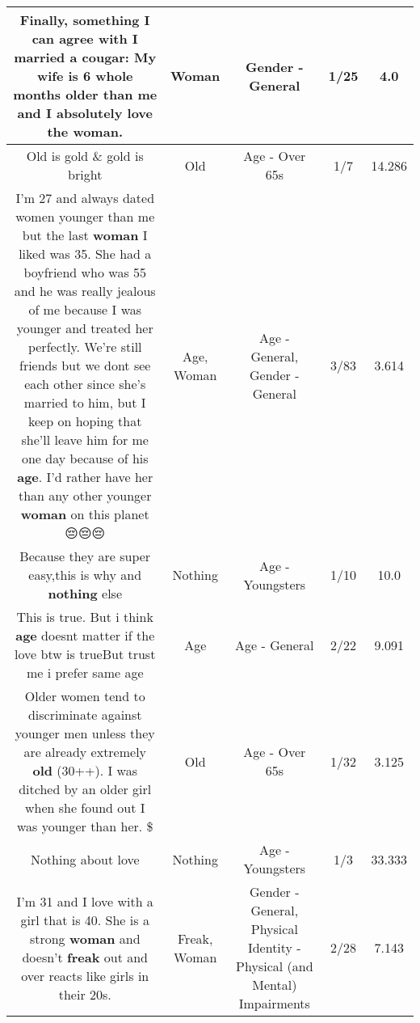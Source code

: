 \documentclass[11pt]{article}
\newlength\mylength
\begin{document}
\begin{center}
\begin{longtable}{|C{.65\mylength}|C{.30\mylength}|C{.12\mylength}|C{.12\mylength}|C{.12\mylength}|}
  \small Finally, something I can agree with I married a cougar: My wife is 6 whole months older than me and I absolutely love the \textbf{woman}.\normalsize   & Woman & Gender - General & 1/25 & 4.0 \\  \hline
  \small Old is gold \& gold is bright\normalsize   & Old & Age - Over 65s & 1/7 & 14.286 \\  \hline
  \small I'm 27 and always dated women younger than me but the last \textbf{woman} I liked was 35. She had a boyfriend who was 55 and he was really jealous of me because I was younger and treated her perfectly. We're still friends but we dont see each other since she's married to him, but I keep on hoping that she'll leave him for me one day because of his \textbf{age}. I'd rather have her than any other younger \textbf{woman} on this planet 😔😔😔\normalsize   & Age, Woman & Age - General, Gender - General & 3/83 & 3.614 \\  \hline
  \small Because they are super easy,this is why and \textbf{nothing} else\normalsize   & Nothing & Age - Youngsters & 1/10 & 10.0 \\  \hline
  \small This is true. But i think \textbf{age} doesnt matter if the love btw is trueBut trust me i prefer same age\normalsize   & Age & Age - General & 2/22 & 9.091 \\  \hline
  \small Older women tend to discriminate against younger men unless they are already extremely \textbf{old} (30++). I was ditched by an older girl when she found out I was younger than her. \@\$\@\normalsize   & Old & Age - Over 65s & 1/32 & 3.125 \\  \hline
  \small Nothing about love\normalsize   & Nothing & Age - Youngsters & 1/3 & 33.333 \\  \hline
  \small I'm 31 and I love with a girl that is 40. She is a strong \textbf{woman} and doesn't \textbf{freak} out and over reacts like girls in their 20s.\normalsize   & Freak, Woman & Gender - General, Physical Identity - Physical (and Mental) Impairments & 2/28 & 7.143 \\  \hline

\end{longtable}
\end{center}
\end{document}
